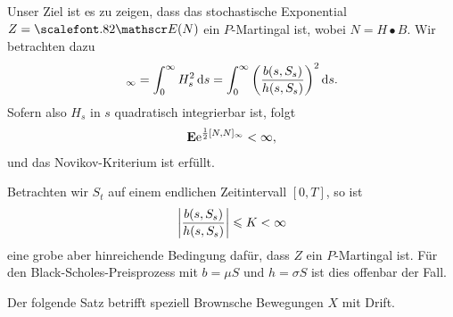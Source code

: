 \begin{ex*}
Unser Ziel ist es zu zeigen, dass  
das stochastische Exponential
$Z = \Ep(N)$ ein $P$-Martingal ist, wobei $N=H\bullet B$. Wir betrachten dazu
\begin{align*}
[N,N]_\infty = \int_0^\infty H_s^2 \,\ds = \int_0^\infty
\left(\frac{b(s,S_s)}{h(s,S_s)}\right)^2\ds.
\end{align*}
Sofern also $H_s$ in $s$ quadratisch integrierbar ist, folgt
\begin{align*}
\E \e^{\frac{1}{2}[N,N]_\infty} < \infty,
\end{align*}
und das Novikov-Kriterium ist erfüllt.

Betrachten wir $S_t$ auf einem endlichen Zeitintervall $[0,T]$, so ist
\begin{align*}
\abs*{\frac{b(s,S_s)}{h(s,S_s)}} \le K < \infty
\end{align*}
eine grobe aber hinreichende Bedingung dafür, dass $Z$ ein $P$-Martingal ist.
Für den Black-Scholes-Preisprozess mit $b=\mu S$ und $h = \sigma S$ ist dies
offenbar der Fall.\bsp
\end{ex*}

Der folgende Satz betrifft speziell Brownsche Bewegungen $X$ mit Drift.

